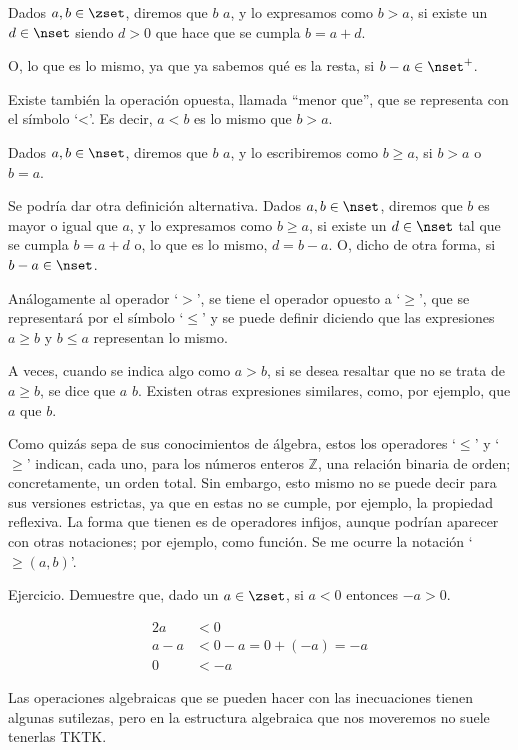 

\begin{deffinition}
  Dados $a, b \in \zset$, diremos que $b$  $a$, y lo
  expresamos como $b > a$, si existe un $d \in \nset$ siendo $d > 0$ que
  hace que se cumpla $b = a + d$.
\end{deffinition}

\noindent O, lo que es lo mismo, ya que ya sabemos qué es la resta, si $b -
a \in \nset^{+}$.

Existe también la operación opuesta, llamada ``menor que'', que se
representa con el símbolo `<'. Es decir, $a < b$ es lo mismo que $b > a$.

\begin{deffinition}
  Dados $a, b \in \nset$, diremos que $b$  $a$, y lo
  escribiremos como $b \geq a$, si $b > a$ o $b = a$.
\end{deffinition}

Se podría dar otra definición alternativa. Dados $a, b \in \nset$, diremos
que $b$ es mayor o igual que $a$, y lo expresamos como $b \geq a$, si existe
un $d \in \nset$ tal que se cumpla $b = a + d$ o, lo que es lo mismo, $d = b
- a$. O, dicho de otra forma, si $b - a \in \nset$.

Análogamente al operador `$>$', se tiene el operador opuesto a `$\geq$', que
se representará por el símbolo `$\leq$' y se puede definir diciendo que las
expresiones $a \geq b$ y $b \leq a$ representan lo mismo.

A veces, cuando se indica algo como $a > b$, si se desea resaltar que no se
trata de $a \geq b$, se dice que $a$  $b$.
Existen otras expresiones similares, como, por ejemplo, que $a$  que $b$.

Como quizás sepa de sus conocimientos de álgebra, estos los operadores
`$\leq$' y `$\geq$' indican, cada uno, para los números enteros
$\mathbb{Z}$, una relación binaria de orden; concretamente, un orden total.
Sin embargo, esto mismo no se puede decir para sus versiones estrictas, ya
que en estas no se cumple, por ejemplo, la propiedad reflexiva. La forma que
tienen es de operadores infijos, aunque podrían aparecer con otras
notaciones; por ejemplo, como función. Se me ocurre la notación `$\geq(a,
b)$'.

Ejercicio. Demuestre que, dado un $a \in \zset$, si $a < 0$ entonces ${-a} >
0$.

\begin{alignat*}{2}
  a         &< 0 \\
  a - a     &< 0 - a = 0 + ({-a}) = {-a} \\
  0         &< {-a}
\end{alignat*}

Las operaciones algebraicas que se pueden hacer con las inecuaciones tienen
algunas sutilezas, pero en la estructura algebraica que nos moveremos no
suele tenerlas TKTK.





